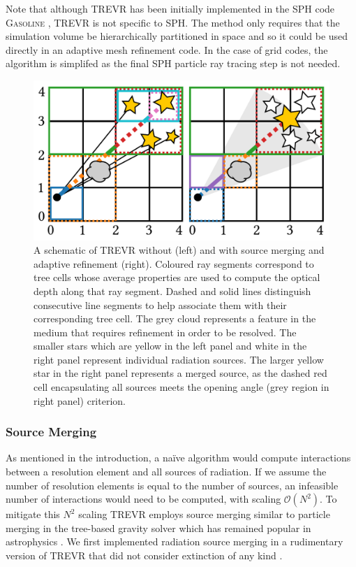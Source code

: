 \documentclass[fleq,usenatbib]{mnras}
\newcommand{\acro}{TREVR}
\newcommand{\bigO}[1]{\mathcal{O}\left(#1\right)}
\begin{document}
{Note that although \acro{} has been initially implemented in the 
SPH code \textsc{Gasoline} \citep{wadsleyEt17}, \acro{} is not specific to 
SPH.  The method only requires that the 
simulation volume be hierarchically partitioned in space and so it could be 
used directly in an adaptive mesh refinement code.   In the case of grid codes,
the algorithm is simplifed as the final SPH particle ray tracing step is not needed.
 
\begin{figure}
\includegraphics[width=1\linewidth]{Figures/algorithm.pdf}
\caption{A schematic of \acro{} without (left) and with source merging and 
adaptive refinement (right). Coloured ray segments correspond to tree cells 
whose average properties are used to compute the optical depth along that ray 
segment. Dashed and solid lines distinguish consecutive line segments to 
help associate them with their corresponding tree cell. The grey cloud 
represents a feature in the medium that requires refinement in order to be 
resolved. The smaller stars which are yellow in the left panel and white in 
the right panel represent individual radiation sources. The larger yellow star 
in the right panel represents a merged source, as the dashed red cell 
encapsulating all sources meets the opening angle (grey region in right panel) 
criterion.} 
\label{fig:algorithm}
\end{figure}

\subsubsection{Source Merging}
As mentioned in the introduction, a na\"ive algorithm would compute 
interactions between a resolution element and  all sources of radiation. If we 
assume the number of resolution elements is equal to the number of sources, 
an infeasible number of interactions would need to be computed, with scaling
$\bigO{N^2}$. To mitigate this $N^2$ scaling \acro{} employs source merging 
similar to particle merging in the \cite{barnesHut86} tree-based gravity 
solver which has remained popular in astrophysics 
\citep{benz88,vineSigurdsson98,springelEt01,wadsleyEt04,hubberEt11}. We first
implemented radiation source merging in a rudimentary version of \acro{} 
that did not consider extinction of any kind \citep{KannanEt14}.

}
\end{document}
